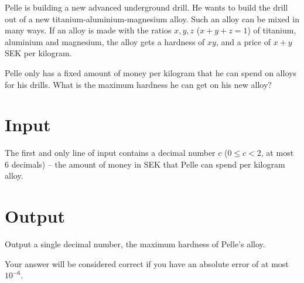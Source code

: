 Pelle is building a new advanced underground drill.
He wants to build the drill out of a new titanium-aluminium-magnesium alloy.
Such an alloy can be mixed in many ways.
If an alloy is made with the ratios $x, y, z$ ($x + y + z = 1$) of titanium, aluminium and magnesium, the alloy gets a hardness of $xy$, and a price of $x + y$ SEK per kilogram.

Pelle only has a fixed amount of money per kilogram that he can spend on alloys for his drills.
What is the maximum hardness he can get on his new alloy?

\section*{Input}
The first and only line of input contains a decimal number $c$ ($0 \le c < 2$, at most 6 decimals) -- the amount of money in SEK that Pelle can spend per kilogram alloy.

\section*{Output}
Output a single decimal number, the maximum hardness of Pelle's alloy.

Your answer will be considered correct if you have an absolute error of at most ${10}^{-6}$.

